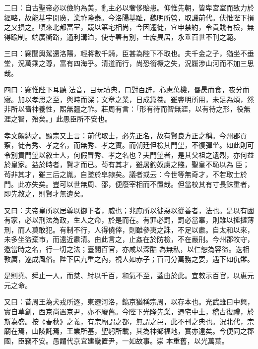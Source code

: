 \begin{pinyinscope}
 二曰：自古聖帝必以儉約為美，亂主必以奢侈貽患。仰惟先朝，皆卑宮室而致力於經略，故能基宇開廣，業祚隆泰。今洛陽基趾，魏明所營，取譏前代。伏惟陛下損之又損之。頃來北都富室，競以第宅相尚，今因遷徙，宜申禁約，令貴賤有檢，無得踰制。端廣衢路，通利溝洫，使寺署有別，士庶異居，永垂百世不刊之範。



 三曰：竊聞輿駕還洛陽，輕將數千騎，臣甚為陛下不取也。夫千金之子，猶坐不垂堂，況萬乘之尊，富有四海乎。清道而行，尚恐銜橛之失，況履涉山河而不加三思哉。



 四曰：竊惟陛下耳聽
 法音，目玩墳典，口對百辟，心慮萬機，晷昃而食，夜分而寢。加以孝思之至，與時而深；文章之業，日成篇卷。雖睿明所用，未足為煩，然非所以嗇神養性，熙無疆之祚。莊周有言：「形有待而智無涯，以有待之形，役無涯之智，殆矣。」此愚臣所不安也。



 孝文頗納之。顯宗又上言：前代取士，必先正名，故有賢良方正之稱。今州郡貢察，徒有秀、孝之名，而無秀、孝之實。而朝廷但檢其門望，不復彈坐。如此則可令別貢門望以敘士人，何假冒秀、孝之名也？夫門望者，是其父祖之遺烈，亦何益於皇家。益於時者，賢才而已。茍有其才，雖屠釣奴虜之賤，聖皇不恥以為
 臣；茍非其才，雖三后之胤，自墜於皁隸矣。議者或云：今世等無奇才，不若取士於門。此亦失矣。豈可以世無周、邵，便廢宰相而不置哉。但當校其有寸長銖重者，即先敘之，則賢才無遺矣。



 又曰：夫帝皇所以居尊以御下者，威也；兆庶所以徙惡以從善者，法也。是以有國有家，必以刑法為政，生人之命，於是而在。有罪必罰，罰必當辜，則雖以捶撻薄刑，而人莫敢犯。有制不行，人得僥倖，則雖參夷之誅，不足以肅。自太和以來，未多坐盜棄市，而遠近肅清。由此言之，止姦在於防檢，不在嚴刑。今州郡牧守，邀當時之名，行一切之法；臺閣百官，亦咸以深酷
 為無私，以仁恕為容盜。迭相敦厲，遂成風俗。陛下居九重之內，視人如赤子；百司分萬務之要，遇下如仇讎。



 是則堯、舜止一人，而桀、紂以千百，和氣不至，蓋由於此。宜敕示百官，以惠元元之命。



 又曰：昔周王為犬戎所逐，東遷河洛，鎬京猶稱宗周，以存本也。光武雖曰中興，實自草創，西京尚置京尹，亦不廢舊。今陛下光隆先業，遷宅中土，稽古復禮，於斯為盛。按《春秋》之義，有宗廟謂之都，無謂之邑，此不刊之典也。況北代，宗廟在焉，山陵託焉，王業所基，聖躬所載，其為神鄉福地，實亦遠矣。今便同之郡國，臣竊不安。愚謂代京宜建畿置尹，一如故事。崇
 本重舊，以光萬葉。




\end{pinyinscope}
